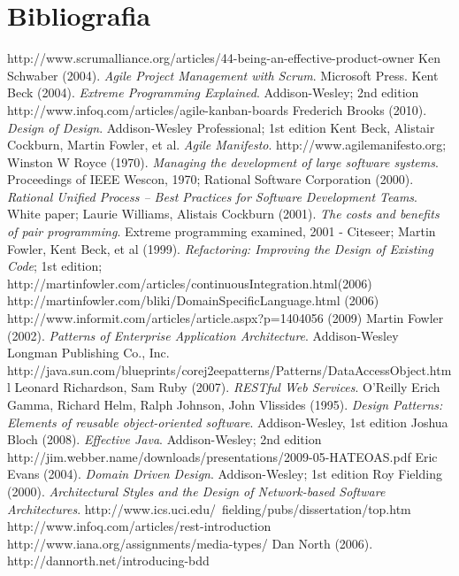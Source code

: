 \section{Bibliografia}

\begin{thebibliography}{30} 

 http://www.scrumalliance.org/articles/44-being-an-effective-product-owner
 Ken Schwaber (2004). \textit{Agile Project Management with Scrum}. Microsoft Press.
 Kent Beck (2004). \textit{Extreme Programming Explained}. Addison-Wesley; 2nd edition
 http://www.infoq.com/articles/agile-kanban-boards
 Frederich Brooks (2010). \textit{Design of Design}. Addison-Wesley Professional; 1st edition
 Kent Beck, Alistair Cockburn, Martin Fowler, et al. \textit{Agile Manifesto}. http://www.agilemanifesto.org;
 Winston W Royce (1970). \textit{Managing the development of large software systems}.
Proceedings of IEEE Wescon, 1970;
 Rational Software Corporation (2000). \textit{Rational Unified Process -- Best Practices for Software Development Teams}. White paper;
 Laurie Williams, Alistais Cockburn (2001). \textit{The costs and benefits of pair programming}. Extreme programming examined, 2001 - Citeseer;
 Martin Fowler, Kent Beck, et al (1999). \textit{Refactoring: Improving the Design of Existing Code}; 1st edition;
 http://martinfowler.com/articles/continuousIntegration.html(2006)
 http://martinfowler.com/bliki/DomainSpecificLanguage.html (2006)
 http://www.informit.com/articles/article.aspx?p=1404056 (2009)
 Martin Fowler (2002). \textit{Patterns of Enterprise Application Architecture}.  Addison-Wesley Longman Publishing Co., Inc.
 http://java.sun.com/blueprints/corej2eepatterns/Patterns/DataAccessObject.html
 Leonard Richardson, Sam Ruby (2007). \textit{RESTful Web Services}. O'Reilly
 Erich Gamma, Richard Helm, Ralph Johnson, John Vlissides (1995). \textit{Design Patterns: Elements of reusable object-oriented software}. Addison-Wesley, 1st edition
 Joshua Bloch (2008). \textit{Effective Java}. Addison-Wesley; 2nd edition
 http://jim.webber.name/downloads/presentations/2009-05-HATEOAS.pdf
 Eric Evans (2004). \textit{Domain Driven Design}. Addison-Wesley; 1st edition 
 Roy Fielding (2000). \textit{Architectural Styles and the Design of Network-based Software Architectures}. http://www.ics.uci.edu/~fielding/pubs/dissertation/top.htm
 http://www.infoq.com/articles/rest-introduction
 http://www.iana.org/assignments/media-types/
 Dan North (2006). http://dannorth.net/introducing-bdd

\end{thebibliography}
